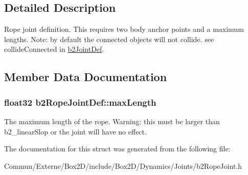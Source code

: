 \subsection{Detailed Description}
Rope joint definition. This requires two body anchor points and a maximum lengths. Note\+: by default the connected objects will not collide. see collide\+Connected in \hyperlink{structb2_joint_def}{b2\+Joint\+Def}. 

\subsection{Member Data Documentation}
\subsubsection[{\texorpdfstring{max\+Length}{maxLength}}]{\setlength{\rightskip}{0pt plus 5cm}float32 b2\+Rope\+Joint\+Def\+::max\+Length}\hypertarget{structb2_rope_joint_def_a6efdcae22e2bdcfc3aae62da1a5f0d69}{}\label{structb2_rope_joint_def_a6efdcae22e2bdcfc3aae62da1a5f0d69}
The maximum length of the rope. Warning\+: this must be larger than b2\+\_\+linear\+Slop or the joint will have no effect. 

The documentation for this struct was generated from the following file\+:\begin{DoxyCompactItemize}
\item 
Commun/\+Externe/\+Box2\+D/include/\+Box2\+D/\+Dynamics/\+Joints/b2\+Rope\+Joint.\+h\end{DoxyCompactItemize}
